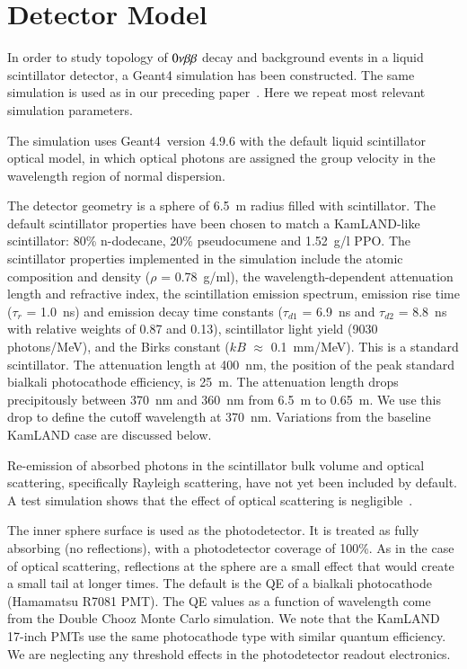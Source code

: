 \section{Detector Model}
\label{sec:detector_description}

In order to study topology of $0\nu\beta\beta$ decay and background events in a liquid scintillator detector, a Geant4\cite{geant4one,geant4two} simulation has been constructed. The same simulation is used as in our preceding paper~\cite{Aberle2014}. Here we repeat most relevant simulation parameters.

The simulation uses Geant4~version 4.9.6 with the default liquid scintillator optical model, in which optical photons are assigned the group velocity in the wavelength region of normal dispersion.

The detector geometry is a sphere of 6.5~m radius filled with
scintillator. The default scintillator properties have been chosen to match a KamLAND-like
scintillator\cite{kamland2003}: 80\% n-dodecane, 20\% pseudocumene and 1.52~g/l PPO. The
scintillator properties implemented in the simulation include the
atomic composition and density ($\rho$ = 0.78~g/ml), the
wavelength-dependent attenuation length\cite{tajimaMaster} and
refractive index\cite{OlegThesis}, the scintillation emission
spectrum\cite{tajimaMaster}, emission rise time ($\tau_r$ = 1.0~ns)
and emission decay time constants ($\tau_{d1}$ = 6.9~ns and
$\tau_{d2}$ = 8.8~ns with relative weights of 0.87 and 
0.13)\cite{tajimaThesis}, scintillator light yield (9030 photons/MeV),
and the Birks constant ($kB$ $\approx$ 0.1~mm/MeV)\cite{ChrisThesis}.  This is a standard scintillator. The attenuation length at 400~nm, the position of the peak standard bialkali photocathode efficiency, is 25~m. The attenuation length drops precipitously between 370~nm and 360~nm from 6.5~m to 0.65~m. We use this drop to define the cutoff wavelength at 370~nm. Variations from the baseline KamLAND case are discussed below. 

Re-emission of absorbed photons in the scintillator
bulk volume and optical scattering, specifically Rayleigh scattering, have not yet been included by default. A test simulation shows that the effect of optical scattering is negligible~\cite{Aberle2014}.

The inner sphere surface is used as the photodetector. It is treated
as fully absorbing (no reflections), with a photodetector coverage of
100\%. As in the case of optical scattering, reflections at the sphere are a small effect that would create a small tail at longer times. The default is the QE of a bialkali photocathode (Hamamatsu
R7081 PMT)\cite{Hamamatsu_R7081}. The QE values as a function of wavelength come from the Double Chooz\cite{dctwo}
Monte Carlo simulation. We note that the KamLAND 17-inch PMTs use the
same photocathode type with similar quantum efficiency. We are neglecting any threshold effects in the photodetector readout electronics.


